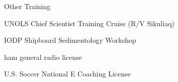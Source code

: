 \begin{cvlist}{Other Training}
\item UNOLS Chief Scientist Training Cruise (R/V Sikuliaq)
    \item IODP Shipboard Sedimentology Workshop
    \item ham general radio license
    \item U.S. Soccer National E Coaching License  
\end{cvlist}
